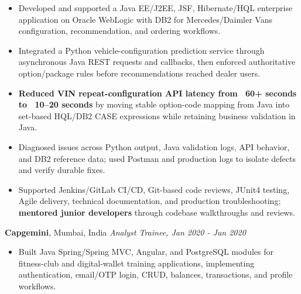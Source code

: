 \documentclass[11pt,letterpaper]{article}
\begin{document}
\begin{itemize}
  \item Developed and supported a Java EE/J2EE, JSF, Hibernate/HQL enterprise application on Oracle WebLogic with DB2 for Mercedes/Daimler Vans configuration, recommendation, and ordering workflows.
  \item Integrated a Python vehicle-configuration prediction service through asynchronous Java REST requests and callbacks, then enforced authoritative option/package rules before recommendations reached dealer users.
  \item \textbf{Reduced VIN repeat-configuration API latency from ~60+ seconds to ~10--20 seconds} by moving stable option-code mapping from Java into set-based HQL/DB2 CASE expressions while retaining business validation in Java.
  \item Diagnosed issues across Python output, Java validation logs, API behavior, and DB2 reference data; used Postman and production logs to isolate defects and verify durable fixes.
  \item Supported Jenkins/GitLab CI/CD, Git-based code reviews, JUnit4 testing, Agile delivery, technical documentation, and production troubleshooting; \textbf{mentored junior developers} through codebase walkthroughs and reviews.
\end{itemize}
\textbf{Capgemini}, Mumbai, India \hfill \textit{Analyst Trainee, Jan 2020 - Jun 2020}
\begin{itemize}
  \item Built Java Spring/Spring MVC, Angular, and PostgreSQL modules for fitness-club and digital-wallet training applications, implementing authentication, email/OTP login, CRUD, balances, transactions, and profile workflows.
\end{itemize}
\end{document}

